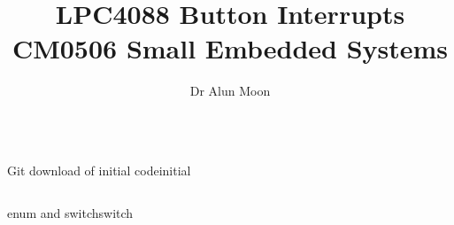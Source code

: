 \documentclass[12pt]{tufte-handout}
\title{LPC4088 Button Interrupts\\\small{CM0506 Small Embedded Systems}}
\author{Dr Alun Moon}
\begin{document}
\maketitle

\begin{verbatim}
\end{verbatim}
\begin{exercise}{Git download of initial code}{initial}
\begin{verbatim}
\end{verbatim}
\end{exercise}
\begin{question}{enum and switch}{switch}
\end{question}




\clearpage
\appendix
\end{document}
